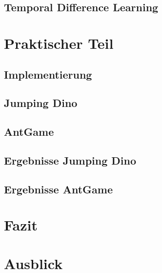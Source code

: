 \documentclass[12pt]{scrartcl}
\numberwithin{equation}{section}
\begin{document}
	\subsection{Temporal Difference Learning}\label{sec:TD}
	

\pagebreak
\section{Praktischer Teil}
	
	\subsection{Implementierung}
	
	\subsection{Jumping Dino}
	
	\subsection{AntGame}
	
	\subsection{Ergebnisse Jumping Dino}
	
	\subsection{Ergebnisse AntGame}
	
\pagebreak
\section{Fazit}
\section{Ausblick}

\pagebreak

\pagebreak


\end{document}
